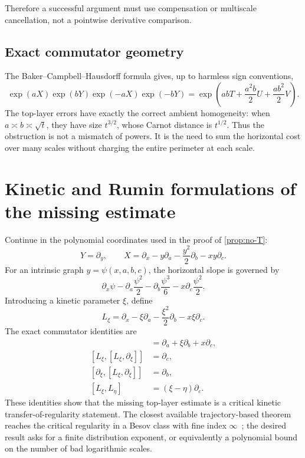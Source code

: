 \documentclass[11pt]{article}
\theoremstyle{definition}
\theoremstyle{remark}
\begin{document}
Therefore a successful argument must use compensation or multiscale cancellation, not
a pointwise derivative comparison.

\subsection{Exact commutator geometry}

The Baker--Campbell--Hausdorff formula gives, up to harmless sign conventions,
\begin{equation}\label{eq:cartan-commutator}
 \exp(aX)\exp(bY)\exp(-aX)\exp(-bY)
 =\exp\left(abT+\frac{a^2b}{2}U+\frac{ab^2}{2}V\right).
\end{equation}
The top-layer errors have exactly the correct ambient homogeneity: when \(a\asymp b\asymp
\sqrt t\), they have size \(t^{3/2}\), whose Carnot distance is \(t^{1/2}\).  Thus the
obstruction is not a mismatch of powers.  It is the need to sum the horizontal cost over
many scales without charging the entire perimeter at each scale.

\section{Kinetic and Rumin formulations of the missing estimate}\label{sec:kinetic}

Continue in the polynomial coordinates used in the proof of \cref{prop:no-T}:
\begin{equation}\label{eq:kinetic-fields}
 Y=\partial_y,
 \qquad
 X=\partial_x-y\partial_a-\frac{y^2}{2}\partial_b-xy\partial_c.
\end{equation}
For an intrinsic graph \(y=\psi(x,a,b,c)\), the horizontal slope is governed by
\[
 \partial_x\psi-\partial_a\frac{\psi^2}{2}
 -\partial_b\frac{\psi^3}{6}
 -x\partial_c\frac{\psi^2}{2}.
\]
Introducing a kinetic parameter \(\xi\), define
\begin{equation}\label{eq:Lxi}
 L_\xi=\partial_x-\xi\partial_a-\frac{\xi^2}{2}\partial_b-x\xi\partial_c.
\end{equation}
The exact commutator identities are
\begin{align}
 [L_\xi,\partial_\xi]
 &=\partial_a+\xi\partial_b+x\partial_c,\label{eq:kin1}\\
 [L_\xi,[L_\xi,\partial_\xi]]&=\partial_c,\label{eq:kin2}\\
 [\partial_\xi,[L_\xi,\partial_\xi]]&=\partial_b,\label{eq:kin3}\\
 [L_\xi,L_\eta]&=(\xi-\eta)\partial_c.\label{eq:kin4}
\end{align}
These identities show that the missing top-layer estimate is a critical kinetic
transfer-of-regularity statement.  The closest available trajectory-based theorem reaches
the critical regularity in a Besov class with fine index \(\infty\)~\cite{Niebel2026}; the
desired result asks for a finite distribution exponent, or equivalently a polynomial bound
on the number of bad logarithmic scales.
\end{document}
